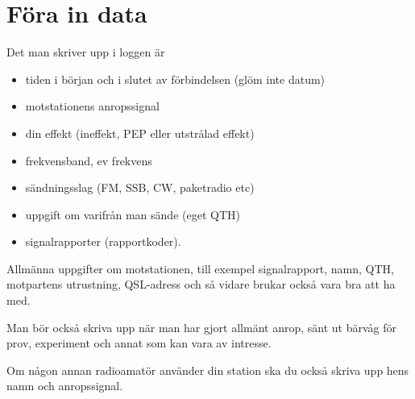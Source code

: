 \newpage %
\section{Föra in data}

Det man skriver upp i loggen är
\begin{itemize}
  \item tiden i början och i slutet av förbindelsen (glöm inte datum)
  \item motstationens anropssignal
  \item din effekt (ineffekt, PEP eller utstrålad effekt)
  \item frekvensband, ev frekvens
  \item sändningsslag (FM, SSB, CW, paketradio etc)
  \item uppgift om varifrån man sände (eget QTH)
  \item signalrapporter (rapportkoder).
\end{itemize}

Allmänna uppgifter om motstationen, till exempel signalrapport, namn, QTH,
motpartens utrustning, QSL-adress och så vidare brukar också vara bra att ha
med.

Man bör också skriva upp när man har gjort allmänt anrop, sänt ut bärvåg för
prov, experiment och annat som kan vara av intresse.

Om någon annan radioamatör använder din station ska du också skriva upp hens
namn och anropssignal.
